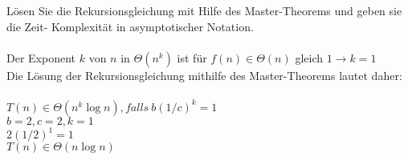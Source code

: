 \documentclass{article}
\begin{document}
\subsection{}
Lösen Sie die Rekursionsgleichung mit Hilfe des Master-Theorems und geben sie die Zeit-
Komplexität in asymptotischer Notation. \\\\
Der Exponent $k$ von $n$ in $\Theta(n^k)$ ist für $f(n) \in \Theta(n)$ gleich $1 \rightarrow k = 1$ \\
Die Lösung der Rekursionsgleichung mithilfe des Master-Theorems lautet daher: \\\\
$T(n) \in \Theta(n^k \log n), falls\ b(1/c)^k = 1$ \\
$b = 2, c = 2, k = 1$ \\
$2(1/2)^1 = 1$ \\
$T(n) \in \Theta(n \log n)$
\end{document}
